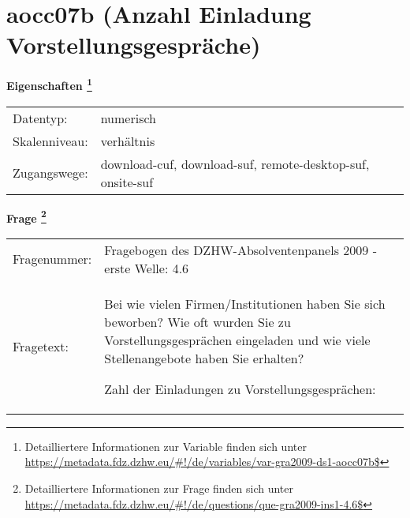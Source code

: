 
    \setcounter{footnote}{0}

    \vspace*{-1.8cm}
	\section{aocc07b (Anzahl Einladung Vorstellungsgespräche)}
	\label{section:aocc07b}



    \vspace*{0.5cm}
    \noindent\textbf{Eigenschaften
	\footnote{Detailliertere Informationen zur Variable finden sich unter
		\url{https://metadata.fdz.dzhw.eu/\#!/de/variables/var-gra2009-ds1-aocc07b$}}}\\
	\begin{tabularx}{\hsize}{@{}lX}
	Datentyp: & numerisch \\
	Skalenniveau: & verhältnis \\
	Zugangswege: &
	  download-cuf, 
	  download-suf, 
	  remote-desktop-suf, 
	  onsite-suf
 \\
    \end{tabularx}



				\vspace*{0.5cm}
                \noindent\textbf{Frage
	                \footnote{Detailliertere Informationen zur Frage finden sich unter
		              \url{https://metadata.fdz.dzhw.eu/\#!/de/questions/que-gra2009-ins1-4.6$}}}\\
				\begin{tabularx}{\hsize}{@{}lX}
					Fragenummer: &
					  Fragebogen des DZHW-Absolventenpanels 2009 - erste Welle:
					  4.6
 \\
					Fragetext: & Bei wie vielen Firmen/Institutionen haben Sie sich beworben? Wie oft wurden Sie zu Vorstellungsgesprächen eingeladen und wie viele Stellenangebote haben Sie erhalten?\par  Zahl der Einladungen zu Vorstellungsgesprächen: \\
				\end{tabularx}





